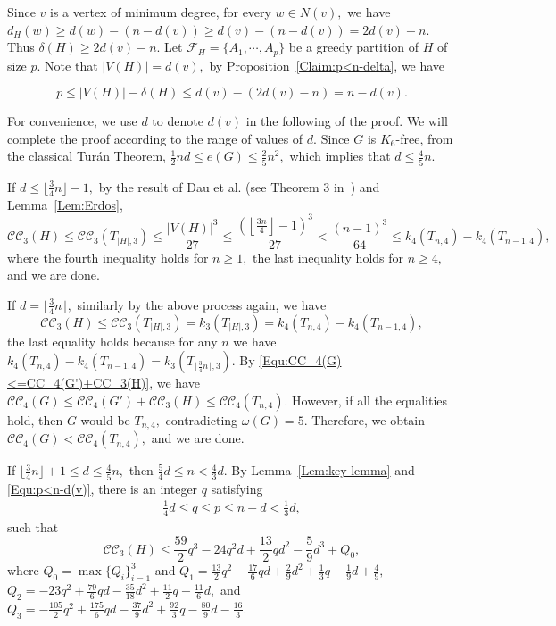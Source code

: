 \documentclass[11pt,a4paper]{article}
\newcommand{\dF}{{\mathcal{F}}}
\newcommand{\turangraph}[2]{T_{#1,#2}}
\newcommand{\coveropt}[2]{{\mathcal{C}\mathcal{C}_{#1}(#2)}}
\begin{document}
Since $v$ is a vertex of minimum degree, for every $w \in N(v),$ we have
$d_H(w) \geq d(w)-(n-d(v))\geq d(v)-(n-d(v)) =2d(v)-n.$
Thus $\delta(H) \geq 2d(v) -n.$
Let $\dF_H= \{A_1, \cdots, A_p\}$ be a greedy partition of $H$ of size $p$.
Note that $|V(H)|=d(v),$ by Proposition~\ref{Claim:p<n-delta}, we have

\begin{equation}\label{Equ:p<n-d(v)}
p\le |V(H)|-\delta(H)\le d(v)-(2d(v)-n)=n-d(v).
\end{equation}

For convenience, we use $d$ to denote $d(v)$ in the following of the proof.
We will complete the proof according to the range of values of $d.$
Since  $G$ is $K_6$-free, 
from the classical Tur\'{a}n Theorem,
$\frac 1 2 n d \le e(G)\leq \frac{2}{5}n^2,$
which implies that $d\leq \frac{4}{5}n.$
\medskip


If $d\leq \lfloor \frac{3}{4}n \rfloor-1,$ 
by the result of Dau et al. (see Theorem 3 in~\cite{DMP}) and Lemma~\ref{Lem:Erdos},
$$
\coveropt{3}{H}\leq \coveropt{3}{\turangraph{|H|}{3}}\le 
\frac{|V(H)|^3}{27}  
\leq \frac{\left(\left\lfloor \frac{3n}{4} \right\rfloor-1\right)^3}{27}  
< \frac{(n-1)^3}{64}
\le k_4(\turangraph{n}{4})-k_4(\turangraph{n-1}{4}),
$$
where the fourth inequality holds for $n\ge 1,$
the last inequality holds for $n\ge 4,$ and we are done.

If $d = \lfloor \frac{3}{4}n \rfloor,$ 
similarly by the above process again, we have
$$
\coveropt{3}{H}\leq \coveropt{3}{\turangraph{|H|}{3}}=k_3(\turangraph{|H|}{3}) 
= k_4(\turangraph{n}{4})-k_4(\turangraph{n-1}{4}),
$$
the last equality holds because for any $n$
we have $k_4(\turangraph{n}{4})-k_4(\turangraph{n-1}{4})=k_3\left(\turangraph{\lfloor \frac{3}{4}n \rfloor}{3}\right).$ 
By \eqref{Equ:CC_4(G)<=CC_4(G')+CC_3(H)}, we have 
$\coveropt{4}{G}\le \coveropt{4}{G'}+\coveropt{3}{H}\le \coveropt{4}{\turangraph{n}{4}}.$
However, if all the equalities hold, then $G$ would be $\turangraph{n}{4},$ contradicting $\omega(G)=5.$
Therefore, we obtain $\coveropt{4}{G}< \coveropt{4}{\turangraph{n}{4}},$ and we are done.

If $\lfloor \frac{3}{4}n \rfloor +1\leq d \leq \frac{4}{5}n,$
then 
$\frac{5}{4}d\le n< \frac 43d.$
By Lemma~\ref{Lem:key lemma} and \eqref{Equ:p<n-d(v)}, there is an integer $q$ satisfying
\begin{align}\label{Equ:range of q}
    \frac 1 4 d\le q\le p\le n-d<\frac 1 3 d,
\end{align}
such that
$$\coveropt{3}{H}\le \frac{59}{2}q^3 -24q^2d +\frac{13}{2}qd^2 -\frac{5}{9}d^3+Q_0,$$
where $Q_0=\max\{Q_i\}_{i=1}^3$
and   $Q_1=\frac{13}{2}q^2-\frac{17}{6}qd+\frac{2}{9}d^2+\frac{1}{3}q-\frac{1}{9}d+\frac{4}{9},$
       $Q_2=-23q^2+\frac{79}{6}qd-\frac{35}{18}d^2+\frac{11}{2}q-\frac{11}{6}d,$ and
       $Q_3= -\frac{105}{2}q^2+\frac{175}{6}qd-\frac{37}{9}d^2+\frac{92}{3}q-\frac{80}{9}d-\frac{16}{3}.$
\end{document}
